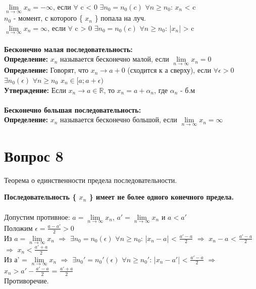 \documentclass{article}
\DeclareMathOperator{\Exists}{\exists}
\DeclareMathOperator{\Forall}{\forall}
\begin{document}
   $\lim\limits_{n \to \infty} {x_n} = - \infty$, если $\Forall$ c < 0 $ \Exists n_0 = n_0 (c)$ $\Forall n \geq n_0$:  $x_n$ < c \\
   $n_0$ - момент, с которого \{ $x_n$ \} попала на луч. \\
   $\lim\limits_{n \to \infty} {x_n} =  \infty$, если $\Forall$ c > 0 $ \Exists n_0 = n_0 (c)$ $\Forall n \geq n_0$:  |$x_n$| > c \\
   \\
   \textbf{Бесконечно малая последовательность: } \\
   \textbf{Определение: }
   $x_n$ называется бесконечно малой, если $\lim\limits_{n \to \infty} {x_n} = 0$ \\
   \textbf{Определение: }
   Говорят, что $x_n \rightarrow a + 0$ (сходится к а сверху), если $\Forall \epsilon > 0$ $\Exists n_0 (\epsilon) $ $\Forall n \geq n_0$ $x_n \in [ a; a + \epsilon )$ \\
   \textbf{Утверждение: }
   Если $x_n \rightarrow a \in \mathbb{R}$, то $x_n = a + \alpha_n$, где $\alpha_n$ - б.м \\
   \\
   \textbf{Бесконечно большая последовательность:} \\
   \textbf{Определение: }$x_n$ называется бесконечно большой, если $\lim\limits_{n \to \infty} {x_n} = \infty$
    \\
\section*{Вопрос 8}
 
\begin{center}
   {Теорема о единственности предела последовательности.} \\
\end{center}
 
   \textbf{Последовательность \{ $x_n$ \} имеет не более одного конечного предела.} \\
   \\
   {Допустим противное:}
   $a = \lim\limits_{n \to \infty} {x_n}$, $a' = \lim\limits_{n \to \infty} {x_n}$ и $a < a'$ \\
   Положим $\epsilon = \frac{a - a'}{2} > 0$ \\
   Из $a = \lim\limits_{n \to \infty} {x_n}$ $\Rightarrow$ $\Exists n_0 = n_0(\epsilon)$ $\forall n \geq n_0$: |$x_n - a$| < $\frac{a' - a}{2}$ $\Rightarrow$ $x_n - a$ < $\frac{a' - a}{2}$ $\Rightarrow$ $x_n < \frac{a' + a}{2}$ \\
   Из а' = $\lim\limits_{n \to \infty} {x_n}$ $\Rightarrow$ $\Exists n_0' = n_0'(\epsilon)$ $\Forall n \geq n_0'$: |$x_n - a'$| < $\frac{a' - a}{2}$ $\Rightarrow$ $x_n > a' - \frac{a' - a}{2}$ = $\frac{a' + a}{2}$\\
    Противоречие. \\
 
\end{document}
